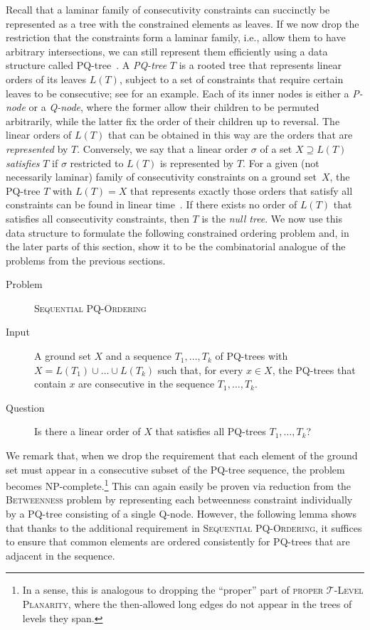 \documentclass[runningheads]{llncs}
\newcommand{\myproblem}[3]{
  \par
\begin{description}
      \item[Problem] #1
      \item[Input] #2
      \item[Question] #3
    \end{description}
\par
}
\newcommand{\pqprob}{\textsc{Sequential PQ-Or\-der\-ing}\xspace}
\newcommand{\tlp}{\textsc{proper $\mathcal T$-Level Planarity}\xspace}
\begin{document}
Recall that a laminar family of consecutivity constraints can succinctly be represented as a tree with the constrained elements as leaves.
If we now drop the restriction that the constraints form a laminar family, i.e., allow them to have arbitrary intersections, we can still represent them efficiently using a data structure called PQ-tree~\cite{bl-tcopi-76}.
A \emph{PQ-tree} $T$ is a rooted tree that represents linear orders of its leaves $L(T)$, subject to a set of constraints that require certain leaves to be consecutive; see  for an example.
Each of its inner nodes is either a \emph{P-node} or a \emph{Q-node}, where the former allow their children to be permuted arbitrarily, while the latter fix the order of their children up to reversal.
The linear orders of $L(T)$ that can be obtained in this way are the orders that are \emph{represented} by $T$.
Conversely, we say that a linear order $\sigma$ of a set $X \supseteq L(T)$
\emph{satisfies} $T$ if $\sigma$ restricted to $L(T)$ is represented by $T$.
For a given (not necessarily laminar) family of consecutivity constraints on a ground set~$X$, the PQ-tree $T$ with $L(T)=X$ that represents exactly those orders that satisfy all constraints can be found in linear time~\cite{bl-tcopi-76}.
If there exists no order of $L(T)$ that satisfies all consecutivity constraints, then $T$ is the \emph{null tree}.
We now use this data structure to formulate the following constrained ordering problem and, in the later parts of this section, show it to be the combinatorial analogue of the problems from the previous sections.

\myproblem{\pqprob}{
  A ground set $X$ and a sequence $T_1, \dots, T_k$ of PQ-trees with $X = {L(T_1) \cup \dots \cup L(T_k)}$ such that, for every $x \in X$, the PQ-trees that contain $x$ are consecutive in the sequence $T_1, \dots, T_k$.
}{
  Is there a linear order of $X$ that satisfies all PQ-trees $T_1, \dots, T_k$?
}

We remark that, when we drop the requirement that each element of the ground set must appear in a consecutive subset of the PQ-tree sequence, the problem becomes NP-complete.\footnote{In a sense, this is analogous to dropping the ``proper'' part of \tlp, where the then-allowed long edges do not appear in the trees of levels they span.}
This can again easily be proven via reduction from the \textsc{Betweenness} problem by representing each betweenness constraint individually by a PQ-tree consisting of a single Q-node.
However, the following lemma shows that thanks to the additional requirement in \pqprob, it suffices to ensure that common elements are ordered consistently for PQ-trees that are adjacent in the sequence.
\end{document}
